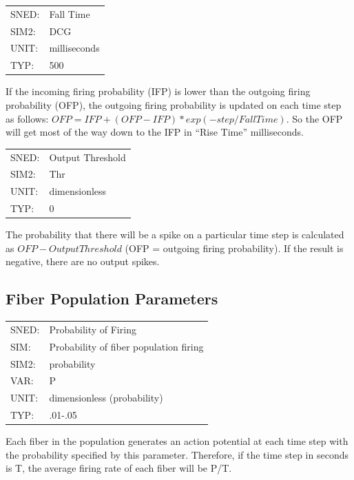 \documentclass[12pt,openany,oneside]{book}
\begin{document}
\begin{flushleft}
\begin{tabular}{@{}ll@{}}
SNED: & Fall Time\\
SIM2: & DCG\\
UNIT: & milliseconds\\
TYP: & 500\\
\end{tabular}
\end{flushleft}
\noindent
If the incoming firing probability (IFP) is lower than the outgoing
firing probability (OFP), the outgoing firing probability is updated
on each time step as follows: $OFP = IFP + (OFP - IFP) * exp
(-step / FallTime)$.  So the OFP will get most of the way down to the
IFP in ``Rise Time'' milliseconds.
\filbreak
\vspace{\baselineskip}

\begin{flushleft}
\begin{tabular}{@{}ll@{}}
SNED: & Output Threshold\\
SIM2: & Thr\\
UNIT: & dimensionless\\
TYP: & 0\\
\end{tabular}
\end{flushleft}
\noindent
The probability that there will be a spike on a particular time step
is calculated as $OFP - OutputThreshold$ (OFP = outgoing firing probability).
If the result is negative, there are no output spikes.
\filbreak
\vspace{\baselineskip}


\subsection{Fiber Population Parameters}
\label{Fiber Parameters}

\begin{flushleft}
\begin{tabular}{@{}ll@{}}
SNED: & Probability of Firing\\
SIM: & Probability of fiber population firing\\
SIM2: & probability\\
VAR: & P\\
UNIT: & dimensionless (probability)\\
TYP: & .01-.05\\
\end{tabular}
\end{flushleft}
\noindent
Each fiber in the population generates an action potential at each
time step with the probability specified by this parameter.
Therefore, if the time step in seconds is T, the average firing rate
of each fiber will be P/T.
\filbreak
\vspace{\baselineskip}
\end{document}
